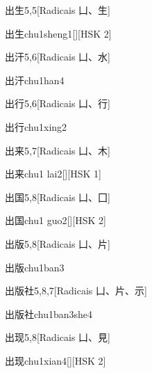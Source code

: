 \begin{entry}{出生}{5,5}[Radicais ⼐、⽣]
  \begin{phonetics}{出生}{chu1sheng1}[][HSK 2]
  \end{phonetics}
\end{entry}

\begin{entry}{出汗}{5,6}[Radicais ⼐、⽔]
  \begin{phonetics}{出汗}{chu1han4}
  \end{phonetics}
\end{entry}

\begin{entry}{出行}{5,6}[Radicais ⼐、⾏]
  \begin{phonetics}{出行}{chu1xing2}
  \end{phonetics}
\end{entry}

\begin{entry}{出来}{5,7}[Radicais ⼐、⽊]
  \begin{phonetics}{出来}{chu1 lai2}[][HSK 1]
  \end{phonetics}
\end{entry}

\begin{entry}{出国}{5,8}[Radicais ⼐、⼞]
  \begin{phonetics}{出国}{chu1 guo2}[][HSK 2]
  \end{phonetics}
\end{entry}

\begin{entry}{出版}{5,8}[Radicais ⼐、⽚]
  \begin{phonetics}{出版}{chu1ban3}
  \end{phonetics}
\end{entry}

\begin{entry}{出版社}{5,8,7}[Radicais ⼐、⽚、⽰]
  \begin{phonetics}{出版社}{chu1ban3she4}
  \end{phonetics}
\end{entry}

\begin{entry}{出现}{5,8}[Radicais ⼐、⾒]
  \begin{phonetics}{出现}{chu1xian4}[][HSK 2]
  \end{phonetics}
\end{entry}

